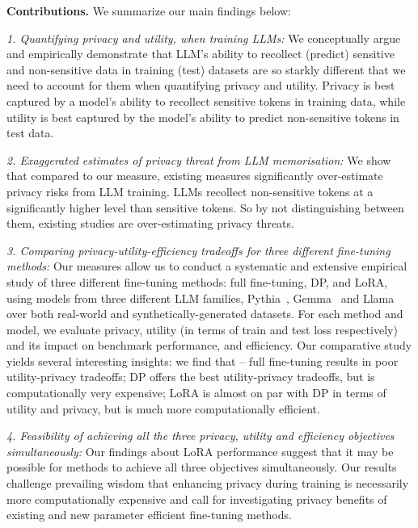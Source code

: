 \noindent \textbf{Contributions.} We summarize our main findings below:

\noindent \emph{1. Quantifying privacy and utility, when training LLMs:} We conceptually argue and empirically demonstrate that LLM's ability to recollect (predict) sensitive and non-sensitive data in training (test) datasets are so starkly different that we need to account for them when quantifying privacy and utility. Privacy is best captured by a model's ability to recollect sensitive tokens in training data, while utility is best captured by the model's ability to predict non-sensitive tokens in test data.

\noindent \emph{2. Exaggerated estimates of privacy threat from LLM memorisation:} We show that compared to our measure, existing measures significantly over-estimate privacy risks from LLM training. LLMs recollect non-sensitive tokens at a significantly higher level than sensitive tokens. So by not distinguishing between them, existing studies are over-estimating privacy threats.

\noindent \emph{3. Comparing privacy-utility-efficiency tradeoffs for three different fine-tuning methods:} Our measures allow us to conduct a systematic and extensive empirical study of three different fine-tuning methods: full fine-tuning, DP, and LoRA, using models from three different LLM families, Pythia~\cite{biderman2023pythia}, Gemma~\cite{team2024gemma} and Llama~\cite{touvron2023llama} over both real-world and synthetically-generated datasets. For each method and model, we evaluate privacy, utility (in terms of train and test loss respectively) and its impact on benchmark performance, and efficiency. Our comparative study yields several interesting insights:  we find that -- full fine-tuning results in poor utility-privacy tradeoffs; DP offers the best utility-privacy tradeoffs, but is computationally very expensive; LoRA is almost on par with DP in terms of utility and privacy, but is much more computationally efficient. 

\noindent \emph{4. Feasibility of achieving all the three privacy, utility and efficiency objectives simultaneously:} Our findings about LoRA performance suggest that it may be possible for methods to achieve all three objectives simultaneously. Our results challenge prevailing wisdom that enhancing privacy during training is necessarily more computationally expensive and call for investigating privacy benefits of existing and new parameter efficient fine-tuning methods.  